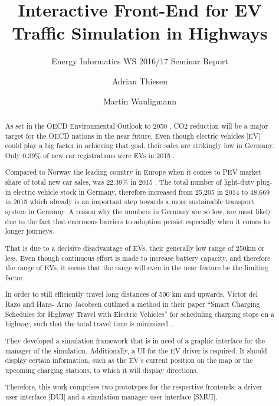 \documentclass[sigconf]{acmart}
\begin{document}
\title{Interactive Front-End for EV Traffic Simulation in Highways}
\subtitle{Energy Informatics WS 2016/17 Seminar Report}

\author{Adrian Thiesen}
\vspace{2cm}

\author{Martin Wauligmann}
\vspace{2cm}


\begin{abstract}
As set in the OECD Environmental Outlook to 2050 \cite{1}, CO2 reduction will be a major target for the OECD nations in the near future. Even though electric vehicles [EV] could play a big factor in achieving that goal, their sales are strikingly low in Germany. Only 0.39\% of new car registrations were EVs in 2015 \cite{2}. 

Compared to Norway the leading country in Europe when it comes to PEV market share of total new car sales, was 22.39\% in 2015 \cite{abstract-3}. The total number of light-duty plug-in electric vehicle stock in Germany, therefore increased from 25,205 \cite{abstract-1} in 2014 to 48,669 in 2015 \cite{abstract-2} which already is an important step towards a more sustainable transport system in Germany. A reason why the numbers in Germany are so low, are most likely due to the fact that enormous barriers to adoption persist especially when it comes to longer journeys.

That is due to a decisive disadvantage of EVs, their generally low range of 250km or less. Even though continuous effort is made to increase battery capacity, and therefore the range of EVs, it seems that the range will even in the near feature be the limiting factor.

In order to still efficiently travel long distances of 500 km and upwards, Victor del Razo and Hans- Arno Jacobsen outlined a method in their paper ``Smart Charging Schedules for Highway Travel with Electric Vehicles'' for scheduling charging stops on a highway, such that the total travel time is minimized \cite{driver-17}.

They developed a simulation framework that is in need of a graphic interface for the manager of the simulation. Additionally, a UI for the EV driver is required. It should display certain information, such as the EV's current position on the map or the upcoming charging stations, to which it will display directions.

Therefore, this work comprises two prototypes for the respective frontends: a driver user interface [DUI] and a simulation manager user interface [SMUI]. 
\end{abstract}
\end{document}
